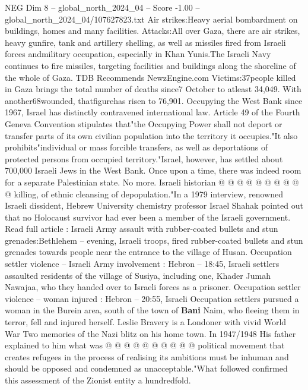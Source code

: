 \begin{textsample}{NEG Dim 8 – global\_north\_2024\_04 – Score -1.00 – global\_north\_2024\_04/107627823.txt}  \label{ex:f8_neg_400}
Air strikes:Heavy aerial bombardment on buildings, homes and many facilities.
Attacks:All over Gaza, there are air strikes, heavy gunfire, tank and artillery shelling, as well as missiles fired from Israeli forces andmilitary occupation, especially in Khan Yunis.The Israeli Navy continues to fire missiles, targeting facilities and buildings along the shoreline of the whole of Gaza.
TDB Recommends NewzEngine.com Victims:37people killed in Gaza brings the total number of deaths since7 October to atleast 34,049.
With another68wounded, thatfigurehas risen to 76,901.
Occupying the West Bank since 1967, Israel has distinctly contravened international law.
Article 49 of the Fourth Geneva Convention stipulates that"the Occupying Power shall not deport or transfer parts of its own civilian population into the territory it occupies."It also prohibits"individual or mass forcible transfers, as well as deportations of protected persons from occupied territory."Israel, however, has settled about 700,000 Israeli Jews in the West Bank.
Once upon a time, there was indeed room for a separate Palestinian state.
No more.
Israeli historian @ @ @ @ @ @ @ @ @ @ killing, of ethnic cleansing of depopulation."In a 1979 interview, renowned Israeli dissident, Hebrew University chemistry professor Israel Shahak pointed out that no Holocaust survivor had ever been a member of the Israeli government.
Read full article : Israeli Army assault with rubber-coated bullets and stun grenades:Bethlehem -- evening, Israeli troops, fired rubber-coated bullets and stun grenades towards people near the entrance to the village of Husan.
Occupation settler violence -- Israeli Army involvement : Hebron -- 18:45, Israeli settlers assaulted residents of the village of Susiya, including one, Khader Jumah Nawajaa, who they handed over to Israeli forces as a prisoner.
Occupation settler violence -- woman injured : Hebron -- 20:55, Israeli Occupation settlers pursued a woman in the Burein area, south of the town of \textbf{Bani} Naim, who fleeing them in terror, fell and injured herself.
Leslie Bravery is a Londoner with vivid World War Two memories of the Nazi blitz on his home town.
In 1947/1948 His father explained to him what was @ @ @ @ @ @ @ @ @ @ political movement that creates refugees in the process of realising its ambitions must be inhuman and should be opposed and condemned as unacceptable."What followed confirmed this assessment of the Zionist entity a hundredfold.

\end{textsample}
